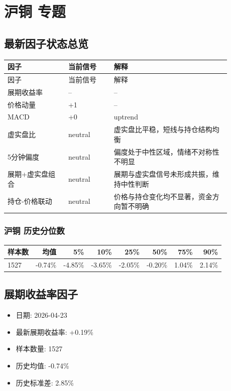 \documentclass[11pt,a4paper]{ctexart}
\begin{document}
\section{沪铜 专题}

\subsection{最新因子状态总览}
\begin{longtable}{p{0.24\linewidth}p{0.18\linewidth}p{0.46\linewidth}}
\toprule
因子 & 当前信号 & 解释 \\
\midrule
\endfirsthead
\toprule
因子 & 当前信号 & 解释 \\
\midrule
\endhead
展期收益率 & -- & -- \\
价格动量 & +1 & -- \\
MACD & +0 & uptrend \\
虚实盘比 & neutral & 虚实盘比平稳，短线与持仓结构均衡 \\
5分钟偏度 & neutral & 偏度处于中性区域，情绪不对称性不明显 \\
展期+虚实盘组合 & neutral & 展期与虚实盘信号未形成共振，维持中性判断 \\
持仓-价格联动 & neutral & 价格与持仓变化均不显著，资金方向暂不明确 \\
\bottomrule
\end{longtable}

\subsubsection{沪铜 历史分位数}
\begin{center}
\begin{tabular}{lrrrrrrr}
\toprule
样本数 & 均值 & 5\% & 10\% & 25\% & 50\% & 75\% & 90\% \\
\midrule
1527 & -0.74\% & -4.85\% & -3.65\% & -2.05\% & -0.20\% & 1.04\% & 2.14\% \\
\bottomrule
\end{tabular}
\end{center}

\subsection{展期收益率因子}
\begin{itemize}
\item 日期: 2026-04-23
\item 最新展期收益率: +0.19\%
\item 样本数量: 1527
\item 历史均值: -0.74\%
\item 历史标准差: 2.85\%
\end{itemize}
\end{document}
